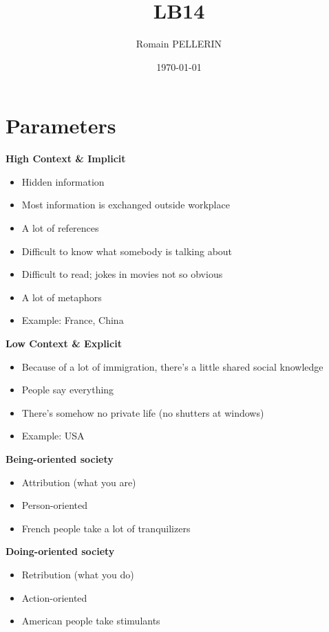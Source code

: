 \documentclass[11pt,a4paper,oneside,french,svgnames]{report}
\title{LB14}
\author{Romain PELLERIN}
\date\today
\begin{document}
\scriptsize

\section*{Parameters}

\begin{center}
\begin{minipage}[t]{.45\textwidth}
\centering\textbf{High Context \& Implicit}\\
  \begin{itemize}
    \item Hidden information
    \item Most information is exchanged outside workplace
    \item A lot of references
    \item Difficult to know what somebody is talking about
    \item Difficult to read; jokes in movies not so obvious
    \item A lot of metaphors
    \item Example: France, China
  \end{itemize}
\end{minipage}
\begin{minipage}[t]{.45\textwidth}
\centering\textbf{Low Context \& Explicit}\\
  \begin{itemize}
    \item Because of a lot of immigration, there's a little shared social knowledge
    \item People say everything
    \item There's somehow no private life (no shutters at windows)
    \item Example: USA
  \end{itemize}
\end{minipage}

\begin{minipage}[t]{.45\textwidth}
\centering\textbf{Being-oriented society}\\
  \begin{itemize}
    \item Attribution (what you are)
    \item Person-oriented
    \item French people take a lot of tranquilizers
  \end{itemize}
\end{minipage}
\begin{minipage}[t]{.45\textwidth}
\centering\textbf{Doing-oriented society}\\
  \begin{itemize}
    \item Retribution (what you do)
    \item Action-oriented
    \item American people take stimulants
  \end{itemize}
\end{minipage}


\end{center}
\end{document}
